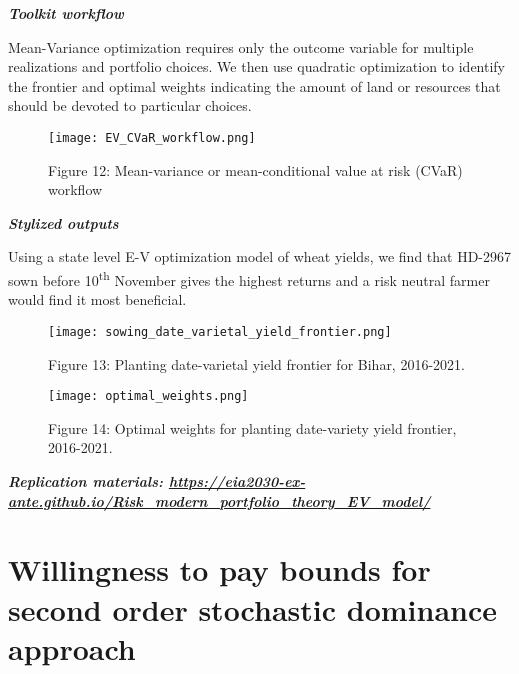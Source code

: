 \documentclass[
  letterpaper,
  DIV=11,
  numbers=noendperiod]{scrreprt}
\begin{document}
\textbf{\emph{Toolkit workflow}}

Mean-Variance optimization requires only the outcome variable for
multiple realizations and portfolio choices. We then use quadratic
optimization to identify the frontier and optimal weights indicating the
amount of land or resources that should be devoted to particular
choices. ~

\begin{figure}[H]

{\centering \texttt{[image: EV\_CVaR\_workflow.png]}

}

\caption{Figure 12: Mean-variance or mean-conditional value at risk
(CVaR) workflow}

\end{figure}%

\textbf{\emph{Stylized outputs}}

Using a state level E-V optimization model of wheat yields, we find that
HD-2967 sown before 10\textsuperscript{th} November gives the highest
returns and a risk neutral farmer would find it most beneficial.

\begin{figure}[H]

{\centering \texttt{[image: sowing\_date\_varietal\_yield\_frontier.png]}

}

\caption{Figure 13: Planting date-varietal yield frontier for Bihar,
2016-2021.}

\end{figure}%
\begin{figure}[H]

{\centering \texttt{[image: optimal\_weights.png]}

}

\caption{Figure 14: Optimal weights for planting date-variety yield
frontier, 2016-2021.}

\end{figure}%

\textbf{\emph{Replication materials:
\url{https://eia2030-ex-ante.github.io/Risk_modern_portfolio_theory_EV_model/}}}

\section{Willingness to pay bounds for second order stochastic dominance
approach}\label{willingness-to-pay-bounds-for-second-order-stochastic-dominance-approach}
\end{document}
